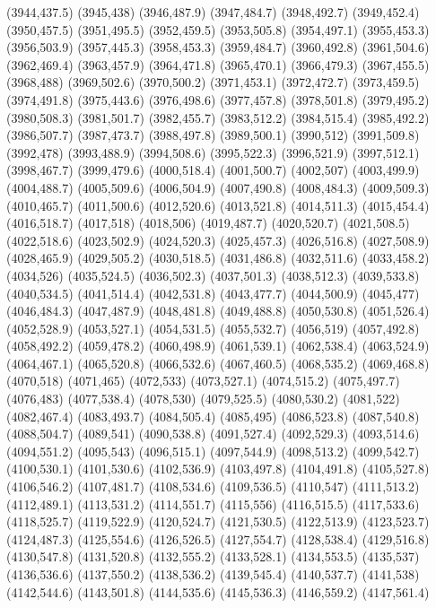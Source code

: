 (3944,437.5)
(3945,438)
(3946,487.9)
(3947,484.7)
(3948,492.7)
(3949,452.4)
(3950,457.5)
(3951,495.5)
(3952,459.5)
(3953,505.8)
(3954,497.1)
(3955,453.3)
(3956,503.9)
(3957,445.3)
(3958,453.3)
(3959,484.7)
(3960,492.8)
(3961,504.6)
(3962,469.4)
(3963,457.9)
(3964,471.8)
(3965,470.1)
(3966,479.3)
(3967,455.5)
(3968,488)
(3969,502.6)
(3970,500.2)
(3971,453.1)
(3972,472.7)
(3973,459.5)
(3974,491.8)
(3975,443.6)
(3976,498.6)
(3977,457.8)
(3978,501.8)
(3979,495.2)
(3980,508.3)
(3981,501.7)
(3982,455.7)
(3983,512.2)
(3984,515.4)
(3985,492.2)
(3986,507.7)
(3987,473.7)
(3988,497.8)
(3989,500.1)
(3990,512)
(3991,509.8)
(3992,478)
(3993,488.9)
(3994,508.6)
(3995,522.3)
(3996,521.9)
(3997,512.1)
(3998,467.7)
(3999,479.6)
(4000,518.4)
(4001,500.7)
(4002,507)
(4003,499.9)
(4004,488.7)
(4005,509.6)
(4006,504.9)
(4007,490.8)
(4008,484.3)
(4009,509.3)
(4010,465.7)
(4011,500.6)
(4012,520.6)
(4013,521.8)
(4014,511.3)
(4015,454.4)
(4016,518.7)
(4017,518)
(4018,506)
(4019,487.7)
(4020,520.7)
(4021,508.5)
(4022,518.6)
(4023,502.9)
(4024,520.3)
(4025,457.3)
(4026,516.8)
(4027,508.9)
(4028,465.9)
(4029,505.2)
(4030,518.5)
(4031,486.8)
(4032,511.6)
(4033,458.2)
(4034,526)
(4035,524.5)
(4036,502.3)
(4037,501.3)
(4038,512.3)
(4039,533.8)
(4040,534.5)
(4041,514.4)
(4042,531.8)
(4043,477.7)
(4044,500.9)
(4045,477)
(4046,484.3)
(4047,487.9)
(4048,481.8)
(4049,488.8)
(4050,530.8)
(4051,526.4)
(4052,528.9)
(4053,527.1)
(4054,531.5)
(4055,532.7)
(4056,519)
(4057,492.8)
(4058,492.2)
(4059,478.2)
(4060,498.9)
(4061,539.1)
(4062,538.4)
(4063,524.9)
(4064,467.1)
(4065,520.8)
(4066,532.6)
(4067,460.5)
(4068,535.2)
(4069,468.8)
(4070,518)
(4071,465)
(4072,533)
(4073,527.1)
(4074,515.2)
(4075,497.7)
(4076,483)
(4077,538.4)
(4078,530)
(4079,525.5)
(4080,530.2)
(4081,522)
(4082,467.4)
(4083,493.7)
(4084,505.4)
(4085,495)
(4086,523.8)
(4087,540.8)
(4088,504.7)
(4089,541)
(4090,538.8)
(4091,527.4)
(4092,529.3)
(4093,514.6)
(4094,551.2)
(4095,543)
(4096,515.1)
(4097,544.9)
(4098,513.2)
(4099,542.7)
(4100,530.1)
(4101,530.6)
(4102,536.9)
(4103,497.8)
(4104,491.8)
(4105,527.8)
(4106,546.2)
(4107,481.7)
(4108,534.6)
(4109,536.5)
(4110,547)
(4111,513.2)
(4112,489.1)
(4113,531.2)
(4114,551.7)
(4115,556)
(4116,515.5)
(4117,533.6)
(4118,525.7)
(4119,522.9)
(4120,524.7)
(4121,530.5)
(4122,513.9)
(4123,523.7)
(4124,487.3)
(4125,554.6)
(4126,526.5)
(4127,554.7)
(4128,538.4)
(4129,516.8)
(4130,547.8)
(4131,520.8)
(4132,555.2)
(4133,528.1)
(4134,553.5)
(4135,537)
(4136,536.6)
(4137,550.2)
(4138,536.2)
(4139,545.4)
(4140,537.7)
(4141,538)
(4142,544.6)
(4143,501.8)
(4144,535.6)
(4145,536.3)
(4146,559.2)
(4147,561.4)
